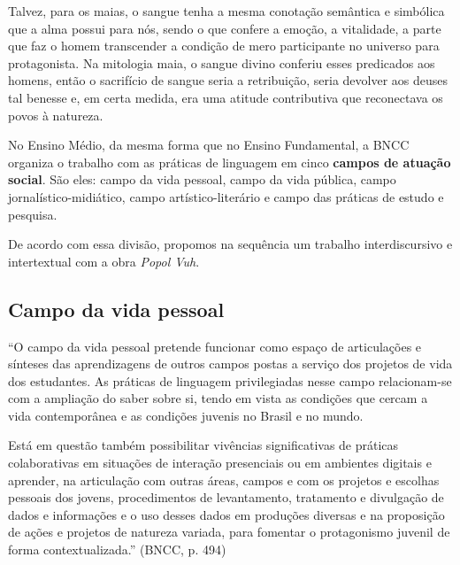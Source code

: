 \documentclass[12pt]{extarticle}
\begin{document}
Talvez, para os maias, o sangue tenha a mesma conotação semântica e
simbólica que a alma possui para nós, sendo o que confere a emoção, a
vitalidade, a parte que faz o homem transcender a condição de mero
participante no universo para protagonista. Na mitologia maia, o sangue
divino conferiu esses predicados aos homens, então o sacrifício de
sangue seria a retribuição, seria devolver aos deuses tal benesse e, em
certa medida, era uma atitude contributiva que reconectava os povos à
natureza.




No Ensino Médio, da mesma forma que no Ensino Fundamental, a BNCC
organiza o trabalho com as práticas de linguagem em cinco \textbf{campos
de atuação social}. São eles: campo da vida pessoal, campo da vida
pública, campo jornalístico-midiático, campo artístico-literário e campo
das práticas de estudo e pesquisa.

De acordo com essa divisão, propomos na sequência um trabalho
interdiscursivo e intertextual com a obra \emph{Popol Vuh}.

\subsection{Campo da vida pessoal}

``O campo da vida pessoal pretende funcionar como espaço de articulações
e sínteses das aprendizagens de outros campos postas a serviço dos
projetos de vida dos estudantes. As práticas de linguagem privilegiadas
nesse campo relacionam-se com a ampliação do saber sobre si, tendo em
vista as condições que cercam a vida contemporânea e as condições
juvenis no Brasil e no mundo.

Está em questão também possibilitar vivências significativas de práticas
colaborativas em situações de interação presenciais ou em ambientes
digitais e aprender, na articulação com outras áreas, campos e com os
projetos e escolhas pessoais dos jovens, procedimentos de levantamento,
tratamento e divulgação de dados e informações e o uso desses dados em
produções diversas e na proposição de ações e projetos de natureza
variada, para fomentar o protagonismo juvenil de forma
contextualizada.'' (BNCC, p. 494)
\end{document}
